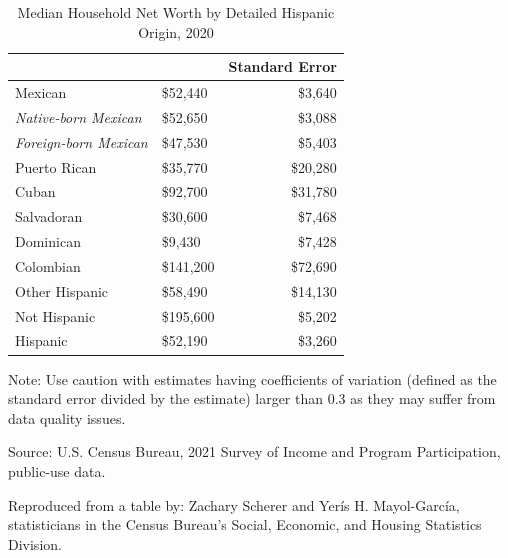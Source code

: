 \documentclass[
]{article}
\begin{document}
\begin{table}[H]
\centering
\begin{threeparttable}
\caption{\label{tab:unnamed-chunk-89}Median Household Net Worth by Detailed Hispanic Origin, 2020}
\centering
\fontsize{8}{10}\selectfont
\begin{tabular}[t]{>{\raggedright\arraybackslash}p{19em}>{\raggedleft\arraybackslash}p{7em}r}
\toprule
\multicolumn{1}{>{\centering\arraybackslash}p{19em}}{\begingroup\fontsize{8}{10}\selectfont \textbf{Hispanic Origin Group}\endgroup} & \multicolumn{1}{>{\centering\arraybackslash}p{7em}}{\begingroup\fontsize{8}{10}\selectfont \textbf{Median Household Net Worth}\endgroup} & \multicolumn{1}{c}{\begingroup\fontsize{8}{10}\selectfont \textbf{Standard Error}\endgroup}\\
\midrule
Mexican & \$52,440 & \$3,640\\
\hspace{.7em}\em{Native-born Mexican} & \$52,650 & \$3,088\\
\hspace{.7em}\em{Foreign-born Mexican} & \$47,530 & \$5,403\\
Puerto Rican & \$35,770 & \$20,280\\
Cuban & \$92,700 & \$31,780\\
Salvadoran & \$30,600 & \$7,468\\
Dominican & \$9,430 & \$7,428\\
Colombian & \$141,200 & \$72,690\\
Other Hispanic & \$58,490 & \$14,130\\
Not Hispanic & \$195,600 & \$5,202\\
Hispanic & \$52,190 & \$3,260\\
\bottomrule
\end{tabular}
\begin{tablenotes}
\small
\item [] \footnotesize{Note: Use caution with estimates having coefficients of variation (defined as the standard error divided by the estimate) larger than 0.3 as they may suffer from data quality issues.}
\item [] \footnotesize{Source: U.S. Census Bureau, 2021 Survey of Income and Program Participation, public-use data.}
\item [] \footnotesize{Reproduced from a table by: Zachary Scherer and Yerís H. Mayol-García, statisticians in the Census Bureau’s Social, Economic, and Housing Statistics Division.}
\end{tablenotes}
\end{threeparttable}
\end{table}
\end{document}

